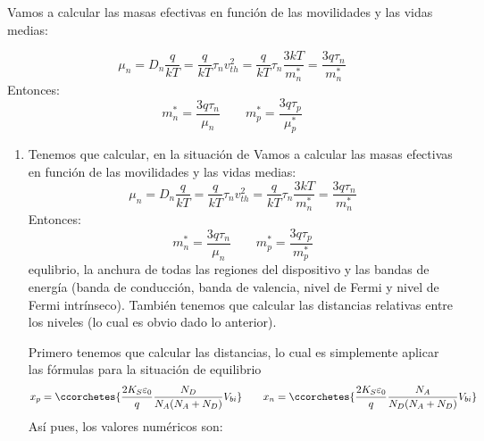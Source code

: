     Vamos a calcular las masas efectivas en función de las movilidades y las vidas medias:

    \begin{equation}
        \mu_n = D_n \frac{q}{kT} = \frac{q}{kT} \tau_n v^2_{th} = \frac{q}{kT} \tau_n \frac{3kT}{m_n^*} = \frac{3q\tau_n}{m_n^*}
    \end{equation}
    Entonces:
    \begin{equation}
        m_n^* = \frac{3q\tau_n}{\mu_n} \qquad m_p^* = \frac{3q\tau_p}{\mu_p^*}
    \end{equation}
    \begin{enumerate}[label=\alph*)]
        \item Tenemos que calcular, en la situación de
        Vamos a calcular las masas efectivas en función de las movilidades y las vidas medias:
        \begin{equation}
            \mu_n = D_n \frac{q}{kT} = \frac{q}{kT} \tau_n v^2_{th} = \frac{q}{kT} \tau_n \frac{3kT}{m_n^*} = \frac{3q\tau_n}{m_n^*}
        \end{equation}
        Entonces:
        \begin{equation}
            m_n^* = \frac{3q\tau_n}{\mu_n} \qquad m_p^* = \frac{3q\tau_p}{m_p^*}
        \end{equation}
        equlibrio, la anchura de todas las regiones del dispositivo y las bandas de energía (banda de conducción, banda de valencia, nivel de Fermi y nivel de Fermi intrínseco). También tenemos que calcular las distancias relativas entre los niveles (lo cual es obvio dado lo anterior).

        Primero tenemos que calcular las distancias, lo cual es simplemente aplicar las fórmulas para la situación de equilibrio
        \begin{equation}
            x_p = \ccorchetes{\frac{2K_S\varepsilon_0}{q} \frac{N_D}{N_A(N_A+N_D)}  V_{bi}}   \qquad
            x_n = \ccorchetes{\frac{2K_S\varepsilon_0}{q} \frac{N_A}{N_D(N_A+N_D)}  V_{bi}}
        \end{equation}
        Así pues, los valores numéricos son:


\end{enumerate}
